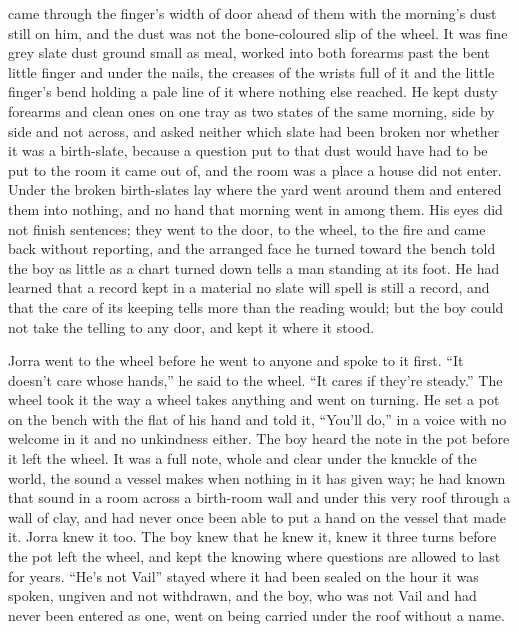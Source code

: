 \scenebreak

 came through the finger's width of door ahead of them with the morning's dust still on him, and the dust was not the bone-coloured slip of the wheel. It was fine grey slate dust ground small as meal, worked into both forearms past the bent little finger and under the nails, the creases of the wrists full of it and the little finger's bend holding a pale line of it where nothing else reached. He kept dusty forearms and clean ones on one tray as two states of the same morning, side by side and not across, and asked neither which slate had been broken nor whether it was a birth-slate, because a question put to that dust would have had to be put to the room it came out of, and the room was a place a house did not enter. Under  the broken birth-slates lay where the yard went around them and entered them into nothing, and no hand that morning went in among them. His eyes did not finish sentences; they went to the door, to the wheel, to the fire and came back without reporting, and the arranged face he turned toward the bench told the boy as little as a chart turned down tells a man standing at its foot. He had learned that a record kept in a material no slate will spell is still a record, and that the care of its keeping tells more than the reading would; but the boy could not take the telling to any door, and kept it where it stood.

Jorra went to the wheel before he went to anyone and spoke to it first. “It doesn't care whose hands,” he said to the wheel. “It cares if they're steady.” The wheel took it the way a wheel takes anything and went on turning. He set a pot on the bench with the flat of his hand and told it, “You'll do,” in a voice with no welcome in it and no unkindness either. The boy heard the note in the pot before it left the wheel. It was a full note, whole and clear under the knuckle of the world, the sound a vessel makes when nothing in it has given way; he had known that sound in a room across a birth-room wall and under this very roof through a wall of clay, and had never once been able to put a hand on the vessel that made it. Jorra knew it too. The boy knew that he knew it, knew it three turns before the pot left the wheel, and kept the knowing where questions are allowed to last for years. “He's not Vail” stayed where it had been sealed on the hour it was spoken, ungiven and not withdrawn, and the boy, who was not Vail and had never been entered as one, went on being carried under the roof without a name.


